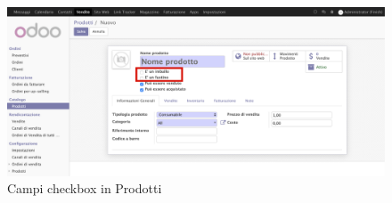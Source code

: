 \vspace*{0.5cm}
\begin{figure}[H]
	\begin{center} \includegraphics[scale=0.3]{figures/order}
		\caption[Campi checkbox in Prodotti]{Campi checkbox in Prodotti}
		\label{fig:order}
	\end{center}
\end{figure}



